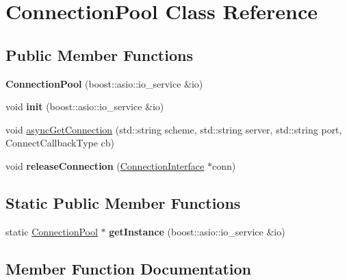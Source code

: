 \hypertarget{class_connection_pool}{}\section{Connection\+Pool Class Reference}
\label{class_connection_pool}
\subsection*{Public Member Functions}
\begin{DoxyCompactItemize}
\item 
\mbox{\label{class_connection_pool_a810f0b989677a5c6ec44b5d8d4f9c93f}} 
{\bfseries Connection\+Pool} (boost\+::asio\+::io\+\_\+service \&io)
\item 
\mbox{\label{class_connection_pool_ab8c78cedcb60144339a9e7c7426592c2}} 
void {\bfseries init} (boost\+::asio\+::io\+\_\+service \&io)
\item 
void \hyperlink{class_connection_pool_acc0c130e9601ab5535693a4f5618eaa1}{async\+Get\+Connection} (std\+::string scheme, std\+::string server, std\+::string port, Connect\+Callback\+Type cb)
\item 
\mbox{\label{class_connection_pool_a5e0cc0906e72ab4e8fe553949dbe0227}} 
void {\bfseries release\+Connection} (\hyperlink{class_connection_interface}{Connection\+Interface} $\ast$conn)
\end{DoxyCompactItemize}
\subsection*{Static Public Member Functions}
\begin{DoxyCompactItemize}
\item 
\mbox{\label{class_connection_pool_a0532d3be3aa1b46efe9d5dc4dd9d8661}} 
static \hyperlink{class_connection_pool}{Connection\+Pool} $\ast$ {\bfseries get\+Instance} (boost\+::asio\+::io\+\_\+service \&io)
\end{DoxyCompactItemize}


\subsection{Member Function Documentation}
\mbox{\label{class_connection_pool_acc0c130e9601ab5535693a4f5618eaa1}} 
